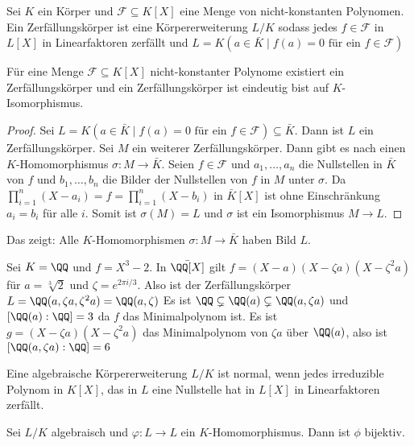 \begin{Def}
    Sei \(K\) ein Körper und \(\mathcal F\subseteq K[X]\) eine Menge von nicht-konstanten Polynomen. Ein Zerfällungskörper ist eine Körpererweiterung \(L/K\) sodass jedes \(f\in\mathcal F\) in \(L[X]\) in Linearfaktoren zerfällt und \(L=K(a\in\bar K\mid f(a)=0 \text{ für ein } f\in\mathcal F)\)
\end{Def}
\begin{Lemma}
    Für eine Menge \(\mathcal F\subseteq K[X]\) nicht-konstanter Polynome existiert ein Zer\-fäl\-lungs\-kör\-per und ein Zer\-fäl\-lungs\-kör\-per ist eindeutig bist auf \(K\)-Isomorphismus.
\end{Lemma}
\begin{proof}
    Sei \(L=K(a\in\bar K\mid f(a)=0 \text{ für ein } f\in\mathcal F)\subseteq \bar K\). Dann ist \(L\) ein Zerfällungskörper.
    Sei \(M\) ein weiterer Zerfällungskörper. Dann gibt es nach  einen \(K\)-Homomorphismus \(\sigma\colon M\to\bar K\). Seien \(f\in\mathcal F\) und \(a_1,\dots, a_n\) die Nullstellen in \(\bar K\) von \(f\) und \(b_1,\dots,b_n\) die Bilder der Nullstellen von \(f\) in \(M\) unter \(\sigma\).
    Da \(\prod_{i=1}^n(X-a_i)=f=\prod_{i=1}^n(X-b_i)\) in \(\bar K[X]\) ist ohne Einschränkung \(a_i=b_i\) für alle \(i\). Somit ist \(\sigma(M)=L\) und \(\sigma\) ist ein Isomorphismus \(M\to L\).
\end{proof}
\begin{Bem}
    Das zeigt: Alle \(K\)-Homomorphismen \(\sigma\colon M\to \bar K\) haben Bild \(L\).
\end{Bem}
\begin{Bsp}
    Sei \(K=\QQ\) und \(f=X^3-2\). In \(\bar\QQ[X]\) gilt \(f=(X-a)(X-\zeta a)(X-\zeta^2a)\) für \(a=\sqrt[3]{2}\) und \(\zeta=e^{2\pi i/3}\).
    Also ist der Zerfällungskörper \(L=\QQ(a,\zeta a,\zeta^2 a)=\QQ(a,\zeta)\)
    Es ist \(\QQ\subsetneq \QQ(a)\subsetneq \QQ(a,\zeta a)\) und \([\QQ(a):\QQ]=3\) da \(f\) das Minimalpolynom ist. Es ist \(g=(X-\zeta a)(X-\zeta^2 a)\) das Minimalpolynom von \(\zeta a\) über \(\QQ(a)\), also ist \([\QQ(a,\zeta a):\QQ]=6\)
\end{Bsp}
\begin{Def}
    Eine algebraische Körpererweiterung \(L/K\) ist normal, wenn jedes irreduzible Polynom in \(K[X]\), das in \(L\) eine Nullstelle hat in \(L[X]\) in Linearfaktoren zerfällt.
\end{Def}
\begin{Lemma}
    Sei \(L/K\) algebraisch und \(\varphi\colon L\to L\) ein \(K\)-Homomorphismus. Dann ist \(\phi\) bijektiv.
\end{Lemma}
